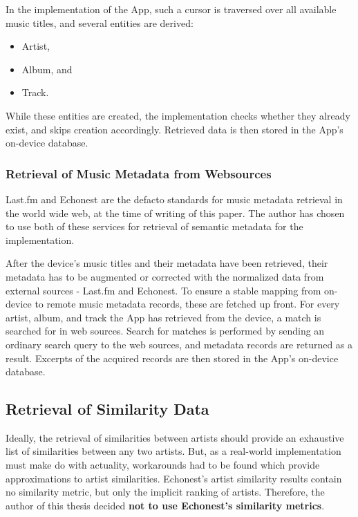 In the implementation of the App, such a cursor is traversed over all available music titles, and several entities are derived:

\begin{itemize}
	\item Artist,
	\item Album, and
	\item Track.
\end{itemize}

While these entities are created, the implementation checks whether they already exist, and skips creation accordingly. Retrieved data is then stored in the App's on-device database.

\subsubsection{Retrieval of Music Metadata from Websources}

Last.fm \cite{url:lastfm} and Echonest \cite{url:echonest} are the defacto standards for music metadata retrieval in the world wide web, 
at the time of writing of this paper. The author has chosen to use both of these services for retrieval 
of semantic metadata for the implementation. 

After the device's music titles and their metadata have been retrieved, their metadata has to be augmented or corrected with the normalized data from external sources - Last.fm and Echonest. To ensure a stable mapping from on-device to remote music metadata records, these are fetched up front. For every artist, album, and track the App has retrieved from the device, a match is searched for in web sources. Search for matches is performed by sending an ordinary search query to the web sources, and metadata records are returned as a result. Excerpts of the acquired records are then stored in the App's on-device database.

\subsection{Retrieval of Similarity Data}

Ideally, the retrieval of similarities between artists should provide an exhaustive list of similarities between any two artists. But, as a real-world implementation must make do with actuality, workarounds had to be found which provide approximations to artist similarities.
Echonest's artist similarity results contain no similarity metric, but only the implicit ranking of artists. Therefore, the author of this thesis decided \textbf{not to use Echonest's similarity metrics}.

